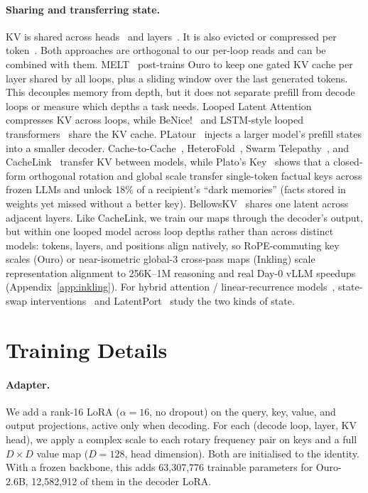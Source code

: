 \documentclass[11pt]{article}
\begin{document}
\paragraph{Sharing and transferring state.} KV is shared across heads~\citep{mqa,gqa} and layers~\citep{cla,mlkv}. It
is also evicted or compressed per token~\citep{streamingllm,h2o,snapkv,pyramidkv}. Both approaches are orthogonal to
our per-loop reads and can be combined with them. MELT~\citep{melt} post-trains Ouro to keep one gated KV cache per
layer shared by all loops, plus a sliding window over the last generated tokens. This decouples memory from depth, but it does not separate prefill from decode loops or measure which depths a task needs. Looped Latent Attention~\citep{lla}
compresses KV across loops, while BeNice!\@~\citep{benice} and LSTM-style looped transformers~\citep{lstmloop} share the
KV cache.
PLatour~\citep{platour} injects a larger model's prefill states into a smaller decoder. Cache-to-Cache~\citep{c2c},
HeteroFold~\citep{heterofold}, Swarm Telepathy~\citep{swat}, and CacheLink~\citep{cachelink} transfer KV between
models, while Plato's Key~\citep{platoskey} shows that a closed-form orthogonal rotation and global scale transfer
single-token factual keys across frozen LLMs and unlock 18\% of a recipient's ``dark memories'' (facts stored in weights
yet missed without a better key). BellowsKV~\citep{bellows} shares one latent across adjacent layers. Like CacheLink, we
train our maps through the decoder's output, but within one looped model across loop depths rather than across distinct
models: tokens, layers, and positions align natively, so RoPE-commuting key scales (Ouro) or near-isometric global-3
cross-pass maps (Inkling) scale representation alignment to 256K--1M reasoning and real Day-0 vLLM speedups
(Appendix~\ref{app:inkling}). For hybrid attention / linear-recurrence models~\citep{gdn,hymba}, state-swap interventions~\citep{afendulev}
and LatentPort~\citep{latentport} study the two kinds of state.


\section{Training Details}
\label{app:training}

\paragraph{Adapter.} We add a rank-16 LoRA ($\alpha=16$, no dropout) on the query, key, value, and output
projections, active only when decoding. For each (decode loop, layer, KV head), we apply a complex scale to each
rotary frequency pair on keys and a full $D\times D$ value map ($D=128$, head dimension). Both are initialised to the
identity. With a frozen backbone, this adds 63,307,776 trainable parameters for Ouro-2.6B, 12,582,912 of them in the
decoder LoRA.
\end{document}
